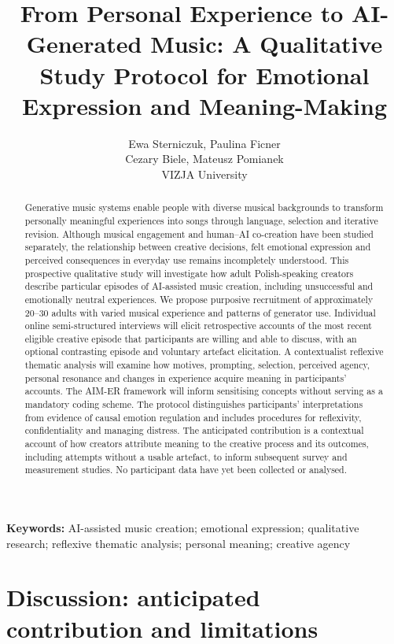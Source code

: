 \documentclass[11pt,a4paper]{article}
\title{From Personal Experience to AI-Generated Music: A Qualitative Study Protocol for Emotional Expression and Meaning-Making}
\author{Ewa Sterniczuk, Paulina Ficner\\Cezary Biele, Mateusz Pomianek\\[0.4em]\small VIZJA University}
\date{}
\begin{document}
\maketitle
\begin{abstract}
Generative music systems enable people with diverse musical backgrounds to transform personally meaningful experiences into songs through language, selection and iterative revision. Although musical engagement and human--AI co-creation have been studied separately, the relationship between creative decisions, felt emotional expression and perceived consequences in everyday use remains incompletely understood. This prospective qualitative study will investigate how adult Polish-speaking creators describe particular episodes of AI-assisted music creation, including unsuccessful and emotionally neutral experiences. We propose purposive recruitment of approximately 20--30 adults with varied musical experience and patterns of generator use. Individual online semi-structured interviews will elicit retrospective accounts of the most recent eligible creative episode that participants are willing and able to discuss, with an optional contrasting episode and voluntary artefact elicitation. A contextualist reflexive thematic analysis will examine how motives, prompting, selection, perceived agency, personal resonance and changes in experience acquire meaning in participants' accounts. The AIM-ER framework will inform sensitising concepts without serving as a mandatory coding scheme. The protocol distinguishes participants' interpretations from evidence of causal emotion regulation and includes procedures for reflexivity, confidentiality and managing distress. The anticipated contribution is a contextual account of how creators attribute meaning to the creative process and its outcomes, including attempts without a usable artefact, to inform subsequent survey and measurement studies. No participant data have yet been collected or analysed.
\end{abstract}
\noindent\textbf{Keywords:} AI-assisted music creation; emotional expression; qualitative research; reflexive thematic analysis; personal meaning; creative agency





\section{Discussion: anticipated contribution and limitations}
\end{document}

